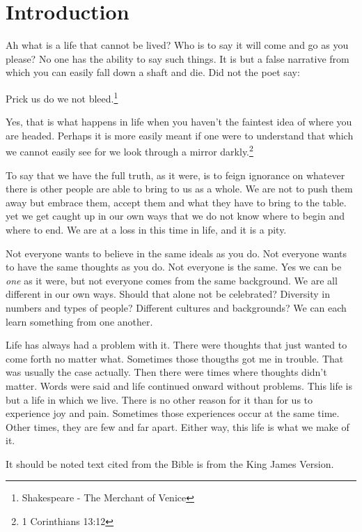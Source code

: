 \chapter{Introduction}

Ah what is a life that cannot be lived? Who is to say it will come and go as you
please? No one has the ability to say such things. It is but a false narrative
from which you can easily fall down a shaft and die. Did not the poet say:

\begin{displayquote}
Prick us do we not bleed.\footnote{Shakespeare - The Merchant of Venice}
\end{displayquote}

Yes, that is what happens in life when you haven't the faintest idea of where
you are headed. Perhaps it is more easily meant if one were to understand that
which we cannot easily see for we look through a mirror 
darkly.\footnote{1 Corinthians 13:12}

To say that we have the full truth, as it were, is to feign ignorance on 
whatever there is other people are able to bring to us as a whole. We are not to 
push them away but embrace them, accept them and what they have to bring to the
table. yet we get caught up in our own ways that we do not know where to begin
and where to end. We are at a loss in this time in life, and it is a pity.

Not everyone wants to believe in the same ideals as you do. Not everyone wants
to have the same thoughts as you do. Not everyone is the same. Yes we can be 
\textit{one} as it were, but not everyone comes from the same background. We 
are all different in our own ways. Should that alone not be celebrated?
Diversity in numbers and types of people? Different cultures and backgrounds? We
can each learn something from one another.

Life has always had a problem with it. There were thoughts that just wanted to
come forth no matter what. Sometimes those thougths got me in trouble. That was
usually the case actually. Then there were times where thoughts didn't matter.
Words were said and life continued onward without problems. This life is but a
life in which we live. There is no other reason for it than for us to experience
joy and pain. Sometimes those experiences occur at the same time. Other times,
they are few and far apart. Either way, this life is what we make of it.

It should be noted text cited from the Bible is from the King James Version.
